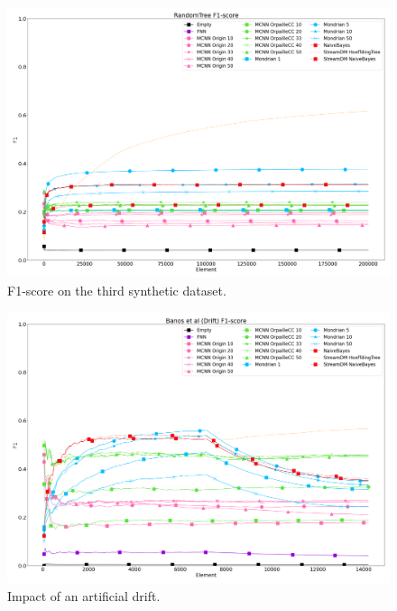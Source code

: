 \begin{figure}[H]
	\includegraphics[width=\linewidth]{figures/results/dataset_3_f1.png}
	\caption{F1-score on the third synthetic dataset.}
\end{figure}
\begin{figure}[H]
	\includegraphics[width=\linewidth]{figures/results/drift_f1.png}
	\caption{Impact of an artificial drift.}
	\label{fig:f1-drift}
\end{figure}

